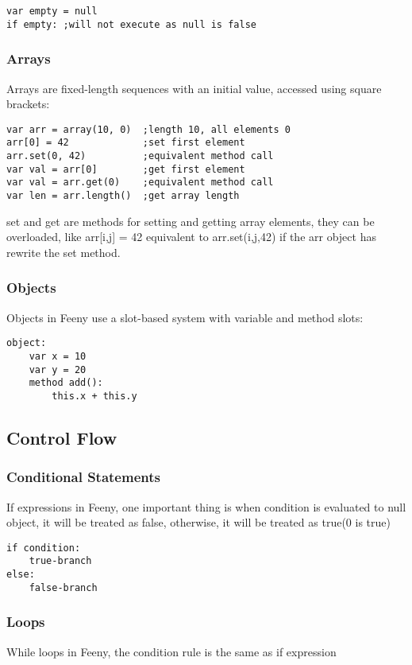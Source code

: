 \documentclass[12pt, a4paper]{article}
\begin{document}
\begin{lstlisting}
var empty = null
if empty: ;will not execute as null is false
\end{lstlisting}

\subsubsection{Arrays}
Arrays are fixed-length sequences with an initial value, accessed using square brackets:

\begin{lstlisting}
var arr = array(10, 0)  ;length 10, all elements 0
arr[0] = 42             ;set first element
arr.set(0, 42)          ;equivalent method call
var val = arr[0]        ;get first element
var val = arr.get(0)    ;equivalent method call
var len = arr.length()  ;get array length
\end{lstlisting}
set and get are methods for setting and getting array elements, they can be overloaded, like arr[i,j] = 42 equivalent to arr.set(i,j,42)
if the arr object has rewrite the set method.

\subsubsection{Objects}
Objects in Feeny use a slot-based system with variable and method slots:

\begin{lstlisting}
object:
    var x = 10
    var y = 20
    method add():
        this.x + this.y
\end{lstlisting}

\subsection{Control Flow}

\subsubsection{Conditional Statements}
If expressions in Feeny, one important thing is when condition is evaluated to null object, it will be treated as false, otherwise, it will be treated as true(0 is true)

\begin{lstlisting}
if condition:
    true-branch
else:
    false-branch
\end{lstlisting}

\subsubsection{Loops}
While loops in Feeny, the condition rule is the same as if expression
\end{document}
